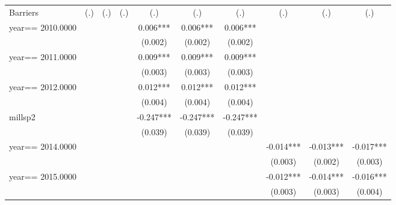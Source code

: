 \begin{table}[htbp]
\begin{tabular}{l*{9}{c}}
Barriers            &         (.)   &         (.)   &         (.)   &         (.)   &         (.)   &         (.)   &         (.)   &         (.)   &         (.)   \\
year==  2010.0000   &               &               &               &       0.006***&       0.006***&       0.006***&               &               &               \\
                    &               &               &               &     (0.002)   &     (0.002)   &     (0.002)   &               &               &               \\
year==  2011.0000   &               &               &               &       0.009***&       0.009***&       0.009***&               &               &               \\
                    &               &               &               &     (0.003)   &     (0.003)   &     (0.003)   &               &               &               \\
year==  2012.0000   &               &               &               &       0.012***&       0.012***&       0.012***&               &               &               \\
                    &               &               &               &     (0.004)   &     (0.004)   &     (0.004)   &               &               &               \\
millsp2             &               &               &               &      -0.247***&      -0.247***&      -0.247***&               &               &               \\
                    &               &               &               &     (0.039)   &     (0.039)   &     (0.039)   &               &               &               \\
year==  2014.0000   &               &               &               &               &               &               &      -0.014***&      -0.013***&      -0.017***\\
                    &               &               &               &               &               &               &     (0.003)   &     (0.002)   &     (0.003)   \\
year==  2015.0000   &               &               &               &               &               &               &      -0.012***&      -0.014***&      -0.016***\\
                    &               &               &               &               &               &               &     (0.003)   &     (0.003)   &     (0.004)   \\

\end{tabular}
\end{table}
